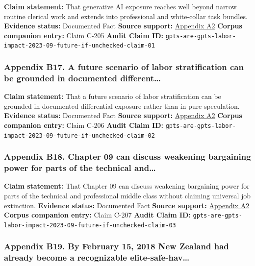 \documentclass[
  american,
  11pt,
  letterpaper,
]{article}
\begin{document}
\textbf{Claim statement:} That generative AI exposure reaches well
beyond narrow routine clerical work and extends into professional and
white-collar task bundles. \textbf{Evidence status:} Documented Fact
\textbf{Source support:}
\hyperref[ch-09-appendix-a2-gpts-are-gpts-an-early-look-at-the-labor-market-impact-potential-of-large-language-models]{Appendix
A2} \textbf{Corpus companion entry:} Claim C-205 \textbf{Audit Claim
ID:}
\texttt{gpts-are-gpts-labor-impact-2023-09-future-if-unchecked-claim-01}

\subsubsection{Appendix B17. A future scenario of labor stratification
can be grounded in documented
different\ldots{}}\label{ch-09-appendix-b17-a-future-scenario-of-labor-stratification-can-be-grounded-in-documented-different}

\textbf{Claim statement:} That a future scenario of labor stratification
can be grounded in documented differential exposure rather than in pure
speculation. \textbf{Evidence status:} Documented Fact \textbf{Source
support:}
\hyperref[ch-09-appendix-a2-gpts-are-gpts-an-early-look-at-the-labor-market-impact-potential-of-large-language-models]{Appendix
A2} \textbf{Corpus companion entry:} Claim C-206 \textbf{Audit Claim
ID:}
\texttt{gpts-are-gpts-labor-impact-2023-09-future-if-unchecked-claim-02}

\subsubsection{Appendix B18. Chapter 09 can discuss weakening bargaining
power for parts of the technical
and\ldots{}}\label{ch-09-appendix-b18-chapter-09-can-discuss-weakening-bargaining-power-for-parts-of-the-technical-and}

\textbf{Claim statement:} That Chapter 09 can discuss weakening
bargaining power for parts of the technical and professional middle
class without claiming universal job extinction. \textbf{Evidence
status:} Documented Fact \textbf{Source support:}
\hyperref[ch-09-appendix-a2-gpts-are-gpts-an-early-look-at-the-labor-market-impact-potential-of-large-language-models]{Appendix
A2} \textbf{Corpus companion entry:} Claim C-207 \textbf{Audit Claim
ID:}
\texttt{gpts-are-gpts-labor-impact-2023-09-future-if-unchecked-claim-03}

\subsubsection{Appendix B19. By February 15, 2018 New Zealand had
already become a recognizable
elite-safe-hav\ldots{}}\label{ch-09-appendix-b19-by-february-15-2018-new-zealand-had-already-become-a-recognizable-elite-safe-hav}
\end{document}
